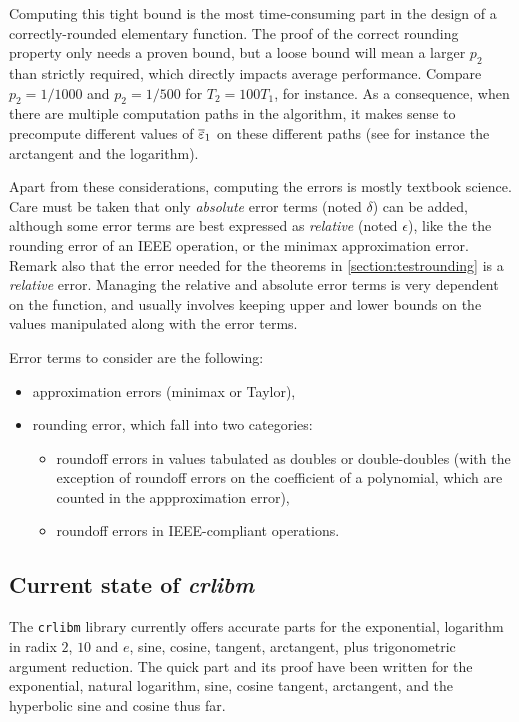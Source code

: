 Computing this tight bound is the most time-consuming part in the
design of a correctly-rounded elementary function. The proof of the
correct rounding property only needs a proven bound, but a loose bound
will mean a larger $p_2$ than strictly required, which directly
impacts average performance. Compare $p_2=1/1000$ and $p_2=1/500$ for
$T_2=100T_1$, for instance. As a consequence, when there are multiple
computation paths in the algorithm, it makes sense to precompute
different values of ${\overline{\varepsilon}}_1$ on these different paths (see for
instance the arctangent and the logarithm).






Apart from these considerations, computing the errors is mostly
textbook science. Care must be taken that only \emph{absolute} error terms
(noted $\delta$) can be added, although some error terms are best
expressed as \emph{relative} (noted $\epsilon$), like the the rounding
error of an IEEE operation, or the minimax approximation error. Remark
also that the error needed for the theorems in
\ref{section:testrounding} is a \emph{relative} error.  Managing the
relative and absolute error terms is very dependent on the function,
and usually involves keeping upper and lower bounds on the values
manipulated along with the error terms.

Error terms to consider are the following:
\begin{itemize}
\item approximation errors  (minimax or Taylor),
\item rounding error, which fall into two categories:
  \begin{itemize}
  \item roundoff errors in values tabulated as doubles or
    double-doubles (with the exception of roundoff errors on the coefficient
    of a polynomial, which are counted in the appproximation error),
  \item roundoff errors in IEEE-compliant operations.
  \end{itemize}
\end{itemize}



\subsection{Current state of \emph{crlibm} 
\label{sec:current-state} }

The \texttt{crlibm} library currently offers accurate parts for the exponential,
logarithm in radix $2$, $10$ and $e$, sine, cosine, tangent,
arctangent, plus trigonometric argument reduction. The quick part and
its proof have been written for the exponential, natural logarithm,
sine, cosine tangent, arctangent, and the hyperbolic sine and cosine
thus far.

